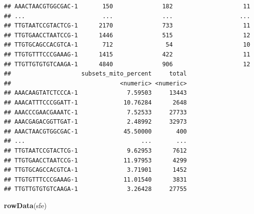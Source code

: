 \documentclass[
]{book}
\newenvironment{Shaded}{\begin{snugshade}}{\end{snugshade}}
\newcommand{\FunctionTok}[1]{\textcolor[rgb]{0.13,0.29,0.53}{\textbf{#1}}}
\newcommand{\NormalTok}[1]{#1}
\begin{document}
\begin{verbatim}
## AAACTAACGTGGCGAC-1       150              182                    11
## ...                      ...              ...                   ...
## TTGTAATCCGTACTCG-1      2170              733                    11
## TTGTGAACCTAATCCG-1      1446              515                    12
## TTGTGCAGCCACGTCA-1       712               54                    10
## TTGTGTTTCCCGAAAG-1      1415              422                    11
## TTGTTGTGTGTCAAGA-1      4840              906                    12
##                    subsets_mito_percent     total
##                               <numeric> <numeric>
## AAACAAGTATCTCCCA-1              7.59503     13443
## AAACATTTCCCGGATT-1             10.76284      2648
## AAACCCGAACGAAATC-1              7.52533     27733
## AAACGAGACGGTTGAT-1              2.48992     32973
## AAACTAACGTGGCGAC-1             45.50000       400
## ...                                 ...       ...
## TTGTAATCCGTACTCG-1              9.62953      7612
## TTGTGAACCTAATCCG-1             11.97953      4299
## TTGTGCAGCCACGTCA-1              3.71901      1452
## TTGTGTTTCCCGAAAG-1             11.01540      3831
## TTGTTGTGTGTCAAGA-1              3.26428     27755
\end{verbatim}

\begin{Shaded}
\begin{Highlighting}[]
\FunctionTok{rowData}\NormalTok{(sfe)}
\end{Highlighting}
\end{Shaded}
\end{document}
